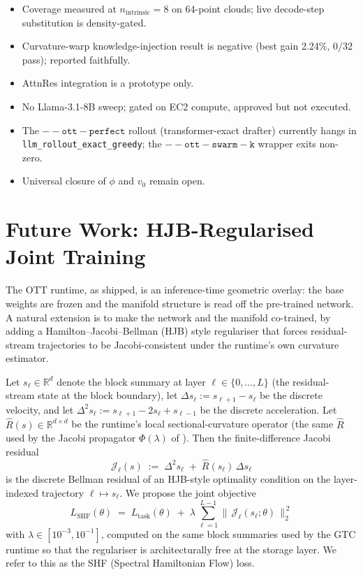 \documentclass[11pt]{article}
\begin{document}
\begin{itemize}
  \item Coverage measured at $n_{\mathrm{intrinsic}}=8$ on 64-point clouds;
        live decode-step substitution is density-gated.
  \item Curvature-warp knowledge-injection result is negative (best
        gain 2.24\%, 0/32 pass); reported faithfully.
  \item AttnRes integration is a prototype only.
  \item No Llama-3.1-8B sweep; gated on EC2 compute, approved but not
        executed.
  \item The $\mathtt{-{}-ott-perfect}$ rollout (transformer-exact drafter)
        currently hangs in \texttt{llm\_rollout\_exact\_greedy}; the
        $\mathtt{-{}-ott-swarm-k}$ wrapper exits non-zero.
  \item Universal closure of $\phi$ and $v_0$ remain open.
\end{itemize}

\section{Future Work: HJB-Regularised Joint Training}
\label{sec:hjb-future}

The OTT runtime, as shipped, is an inference-time geometric overlay: the
base weights are frozen and the manifold structure is read off the
pre-trained network.  A natural extension is to make the network and the
manifold co-trained, by adding a Hamilton--Jacobi--Bellman (HJB)
style regulariser that forces residual-stream trajectories to be
Jacobi-consistent under the runtime's own curvature estimator.

Let $s_\ell\in\mathbb{R}^{d}$ denote the block summary at layer
$\ell\in\{0,\dots,L\}$ (the residual-stream state at the block boundary),
let $\Delta s_\ell := s_{\ell+1}-s_\ell$ be the discrete velocity, and
let $\Delta^2 s_\ell := s_{\ell+1}-2s_\ell+s_{\ell-1}$ be the discrete
acceleration.  Let $\hat R(s)\in\mathbb{R}^{d\times d}$ be the runtime's
local sectional-curvature operator (the same $\hat R$ used by the Jacobi
propagator $\Phi(\lambda)$ of ).  Then the
finite-difference Jacobi residual
\begin{equation}
\mathcal{J}_\ell(s) \;:=\; \Delta^2 s_\ell \;+\; \hat R(s_\ell)\,\Delta s_\ell
\label{eq:jacobi-residual}
\end{equation}
is the discrete Bellman residual of an HJB-style optimality condition on
the layer-indexed trajectory $\ell\mapsto s_\ell$.  We propose the joint
objective
\begin{equation}
\boxed{\;
L_{\mathrm{SHF}}(\theta)
\;=\;
L_{\mathrm{task}}(\theta)
\;+\;
\lambda\,\sum_{\ell=1}^{L-1}
\bigl\|\,\mathcal{J}_\ell(s_\ell;\theta)\,\bigr\|_2^{\,2}
\;}
\label{eq:hjb-loss}
\end{equation}
with $\lambda\in[10^{-3},10^{-1}]$, computed on the same block summaries
used by the GTC runtime so that the regulariser is
architecturally free at the storage layer.  We refer to this as
the SHF (Spectral Hamiltonian Flow) loss.
\end{document}
